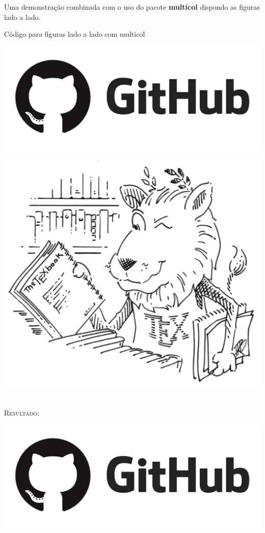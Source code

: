 \documentclass[a4paper,12pt,oneside,openright,extrafontsizes,openbib]{memoir}
\begin{document}
{Uma demonstração combinada com o uso do pacote \textbf{multicol} dispondo as figuras lado a lado.

\begin{codex}{Código para figuras lado a lado com multicol}
\begin{multicols}{2}
\includegraphics[scale=.15]{./img/github.png}

\includegraphics[scale=.040]{./img/tex-lion.png}
\end{multicols}
\end{codex}
\ \\

\textsc{Resultado:}

\begin{multicols}{2}
	\includegraphics[scale=.15]{./img/github.png}
	

\end{multicols}}
\end{document}
